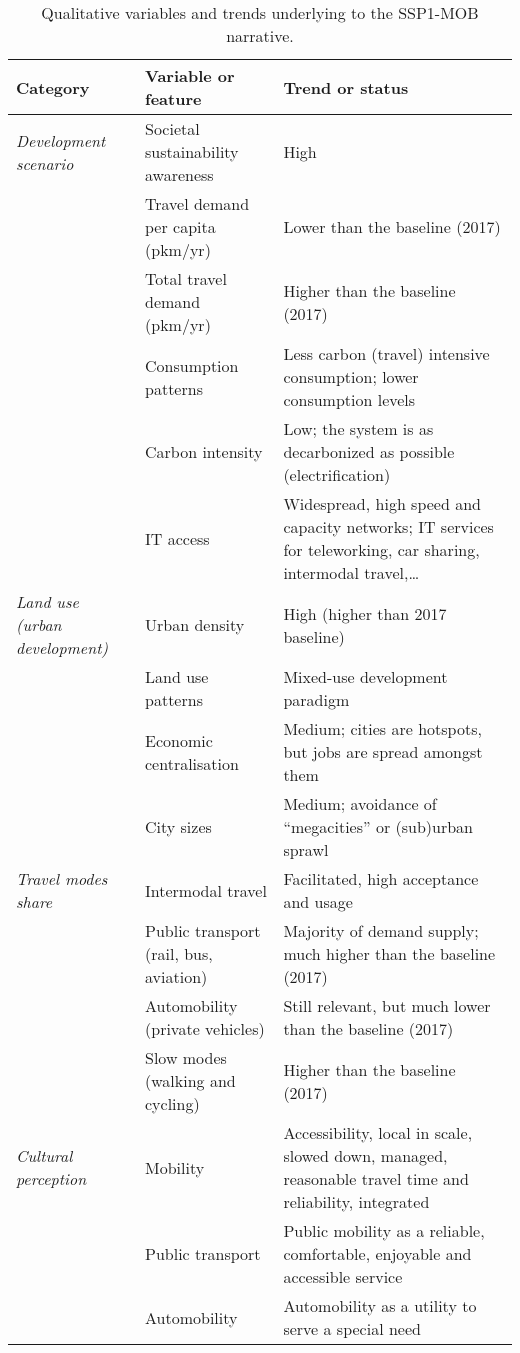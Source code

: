 \begin{table}
\centering
\caption[SSP1-MOB qualitative variables]{Qualitative variables and trends underlying to the SSP1-MOB narrative.}
\label{t:ssp1-mob-narrative-thesis}
\scriptsize
\begin{tabular}{p{2.5cm}p{3cm}p{8cm}}
\toprule
Category & Variable or feature & Trend or status \\ \midrule
\textit{Development scenario} & Societal sustainability awareness & High \\
 & Travel demand per capita (pkm/yr) & Lower than the baseline (2017) \\
 & Total travel demand (pkm/yr) & Higher than the baseline (2017) \\
 & Consumption patterns & Less carbon (travel) intensive consumption; lower consumption levels \\
 & Carbon intensity & Low; the system is as decarbonized as possible (electrification) \\
 & IT access & Widespread, high speed and capacity networks; IT services for teleworking, car sharing, intermodal travel,\ldots\\\midrule
\textit{Land use (urban development)} & Urban density & High (higher than 2017 baseline) \\
 & Land use patterns & Mixed-use development paradigm \\
 & Economic centralisation & Medium; cities are hotspots, but jobs are spread amongst them \\
 & City sizes & Medium; avoidance of ``megacities'' or (sub)urban sprawl \\[0.5cm]
\textit{Travel modes share} & Intermodal travel & Facilitated, high acceptance and usage \\
 & Public transport (rail, bus, aviation) & Majority of demand supply; much higher than the baseline (2017) \\
 & Automobility (private vehicles) & Still relevant, but much lower than the baseline (2017) \\
 & Slow modes (walking and cycling) & Higher than the baseline (2017) \\\midrule
\textit{Cultural perception} & Mobility & Accessibility, local in scale, slowed down, managed, reasonable travel time and reliability, integrated \\
 & Public transport & Public mobility as a reliable, comfortable, enjoyable and accessible service \\
 & Automobility & Automobility as a utility to serve a special need \\\midrule

\end{tabular}
\end{table}
